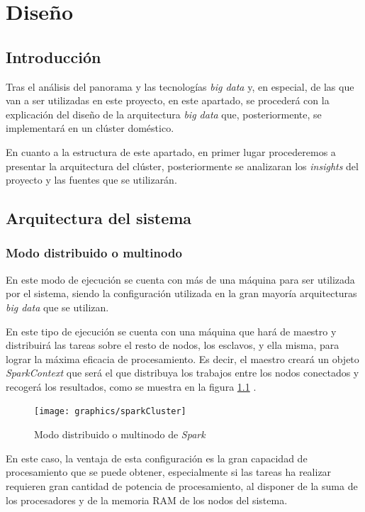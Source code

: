 \chapter{Diseño\label{sec:disenho}}

\section{Introducción}
Tras el análisis del panorama y las tecnologías \textit{big data} y, en especial, de las que van a ser utilizadas en este proyecto, en este apartado, se procederá con la explicación del diseño de la arquitectura \textit{big data} que, posteriormente, se implementará en un clúster doméstico.

En cuanto a la estructura de este apartado, en primer lugar procederemos a presentar la arquitectura del clúster, posteriormente se analizaran los \textit{insights} del proyecto y las fuentes que se utilizarán.

\section{Arquitectura del sistema}
\subsection{Modo distribuido o multinodo \label{disMultinodo}}
En este modo de ejecución se cuenta con más de una máquina para ser utilizada por el sistema, siendo la configuración utilizada en la gran mayoría arquitecturas \textit{big data} que se utilizan. 

En este tipo de ejecución se cuenta con una máquina que hará de maestro y distribuirá las tareas sobre el resto de nodos, los esclavos, y ella misma, para lograr la máxima eficacia de procesamiento. Es decir, el maestro creará un objeto \textit{SparkContext} que será el que distribuya los trabajos entre los nodos conectados y recogerá los resultados, como se muestra en la figura \ref{fig:clusterSpark} \cite{clusterfoto}.

\begin{figure}[htp!]
	\centering
	\caption{Modo distribuido o multinodo de \textit{Spark} \cite{clusterfoto}}
	\label{fig:clusterSpark}
	\texttt{[image: graphics/sparkCluster]}
\end{figure}

En este caso, la ventaja de esta configuración es la gran capacidad de procesamiento que se puede obtener, especialmente si las tareas ha realizar requieren gran cantidad de potencia de procesamiento, al disponer de la suma de los procesadores y de la memoria \gls{RAM} de los nodos del sistema.

